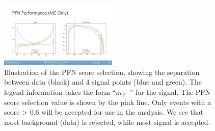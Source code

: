 \begin{figure}[!htbp]
\centering
   \includegraphics[width=0.5\textwidth]{figures/ml/pfn_score_all}
   \caption{Illustration of the PFN score selection, showing the separation between data (black) and 4 signal points (blue and green). The legend information takes the form ``$m_{Z'}$ \rinv'' for the signal. The PFN score selection value is shown by the pink line. Only events with a score > 0.6 will be accepted for use in the analysis. We see that most background (data) is rejected, while most signal is accepted.}
   \label{fig:pfn_score_all}
\end{figure}


\clearpage

